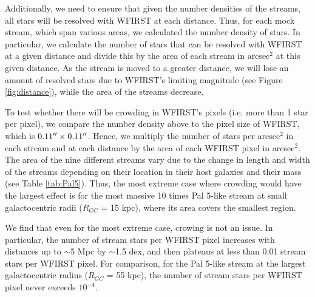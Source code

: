 \documentclass[twocolumn]{aastex62}
\begin{document}
Additionally, we need to ensure that given the number densities of the streams, all stars will be resolved with WFIRST at each distance. Thus, for each mock stream, which span various areas, we calculated the number density of stars. In particular, we calculate the number of stars that can be resolved with WFIRST at a given distance and divide this by the area of each stream in arcsec$^2$ at this given distance. As the stream is moved to a greater distance, we will lose an amount of resolved stars due to WFIRST's limiting magnitude (see Figure \ref{fig:distance}), while the area of the streams decrease. 

To test whether there will be crowding in WFIRST's pixels (i.e. more than 1 star per pixel), we compare the number density above to the pixel size of WFIRST, which is $0.11\mbox{$^{\prime\prime}$} \times 0.11\mbox{$^{\prime\prime}$}$. Hence, we multiply the number of stars per arcsec$^2$ in each stream and at each distance by the area of each WFIRST pixel in arcsec$^2$. The area of the nine different streams vary due to the change in length and width of the streams depending on their location in their host galaxies and their mass (see Table \ref{tab:Pal5}). Thus, the most extreme case where crowding would have the largest effect is for the most massive 10 times Pal 5-like stream at small galactocentric radii ($R_{GC}$ = 15 kpc), where its area covers the smallest region. 

We find that even for the most extreme case, crowing is not an issue. In particular, the number of stream stars per WFIRST pixel increases with distances up to $\sim$5 Mpc by $\sim$1.5 dex, and then plateaus at  less than 0.01 stream stars per WFIRST pixel. For comparison, for the Pal 5-like stream at the largest galactocentric radius ($R_{GC}$ = 55 kpc), the number of stream stars per WFIRST pixel never exceeds $10^{-4}$.

\end{document}
